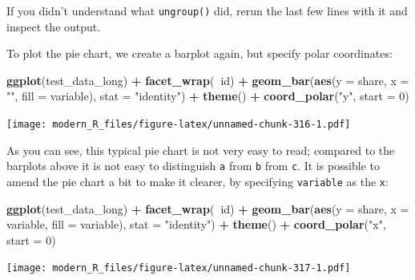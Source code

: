 \documentclass[]{gitbook}
\newenvironment{Shaded}{\begin{snugshade}}{\end{snugshade}}
\newcommand{\DataTypeTok}[1]{\textcolor[rgb]{0.13,0.29,0.53}{#1}}
\newcommand{\DecValTok}[1]{\textcolor[rgb]{0.00,0.00,0.81}{#1}}
\newcommand{\KeywordTok}[1]{\textcolor[rgb]{0.13,0.29,0.53}{\textbf{#1}}}
\newcommand{\NormalTok}[1]{#1}
\newcommand{\OperatorTok}[1]{\textcolor[rgb]{0.81,0.36,0.00}{\textbf{#1}}}
\newcommand{\StringTok}[1]{\textcolor[rgb]{0.31,0.60,0.02}{#1}}
\theoremstyle{definition}
\theoremstyle{definition}
\theoremstyle{definition}
\theoremstyle{remark}
\begin{document}
If you didn't understand what \texttt{ungroup()} did, rerun the last few
lines with it and inspect the output.

To plot the pie chart, we create a barplot again, but specify polar
coordinates:

\begin{Shaded}
\begin{Highlighting}[]
\KeywordTok{ggplot}\NormalTok{(test_data_long) }\OperatorTok{+}
\StringTok{  }\KeywordTok{facet_wrap}\NormalTok{(}\OperatorTok{~}\NormalTok{id) }\OperatorTok{+}
\StringTok{  }\KeywordTok{geom_bar}\NormalTok{(}\KeywordTok{aes}\NormalTok{(}\DataTypeTok{y =}\NormalTok{ share, }\DataTypeTok{x =} \StringTok{""}\NormalTok{, }\DataTypeTok{fill =}\NormalTok{ variable), }\DataTypeTok{stat =} \StringTok{"identity"}\NormalTok{) }\OperatorTok{+}
\StringTok{  }\KeywordTok{theme}\NormalTok{() }\OperatorTok{+}
\StringTok{  }\KeywordTok{coord_polar}\NormalTok{(}\StringTok{"y"}\NormalTok{, }\DataTypeTok{start =} \DecValTok{0}\NormalTok{)}
\end{Highlighting}
\end{Shaded}

\texttt{[image: modern\_R\_files/figure-latex/unnamed-chunk-316-1.pdf]}

As you can see, this typical pie chart is not very easy to read;
compared to the barplots above it is not easy to distinguish \texttt{a}
from \texttt{b} from \texttt{c}. It is possible to amend the pie chart a
bit to make it clearer, by specifying \texttt{variable} as the
\texttt{x}:

\begin{Shaded}
\begin{Highlighting}[]
\KeywordTok{ggplot}\NormalTok{(test_data_long) }\OperatorTok{+}
\StringTok{  }\KeywordTok{facet_wrap}\NormalTok{(}\OperatorTok{~}\NormalTok{id) }\OperatorTok{+}
\StringTok{  }\KeywordTok{geom_bar}\NormalTok{(}\KeywordTok{aes}\NormalTok{(}\DataTypeTok{y =}\NormalTok{ share, }\DataTypeTok{x =}\NormalTok{ variable, }\DataTypeTok{fill =}\NormalTok{ variable), }\DataTypeTok{stat =} \StringTok{"identity"}\NormalTok{) }\OperatorTok{+}
\StringTok{  }\KeywordTok{theme}\NormalTok{() }\OperatorTok{+}
\StringTok{  }\KeywordTok{coord_polar}\NormalTok{(}\StringTok{"x"}\NormalTok{, }\DataTypeTok{start =} \DecValTok{0}\NormalTok{)}
\end{Highlighting}
\end{Shaded}

\texttt{[image: modern\_R\_files/figure-latex/unnamed-chunk-317-1.pdf]}
\end{document}
